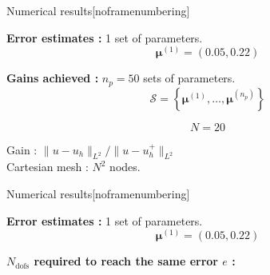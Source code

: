 \begin{appendixframe}{Numerical results}[noframenumbering]
	\hspace{-5pt}\begin{minipage}[t]{0.46\linewidth}
		\textbf{Error estimates :} 1  set of parameters.
		$$\bm{\mu}^{(1)}=(0.05, 0.22) $$
		\vspace{-35pt}
		\begin{figure}[H]
		\end{figure}
	\end{minipage} \qquad \small
	\begin{minipage}[t]{0.48\linewidth}
		\textbf{Gains achieved :} $n_p=50$ sets of parameters.
		$$\mathcal{S}=\left\{\bm{\mu}^{(1)},\dots,\bm{\mu}^{(n_p)}\right\}$$
		\vspace{-15pt}
		\begin{table}[H]
		\end{table}

		\normalsize\centering\vspace{-20pt}
		$$N=20$$

		\vspace{-5pt}
		Gain : $\| u-u_h\|_{L^2} / \| u-u_h^+\|_{L^2}$ \\
		
		\small\vspace{8pt}
		Cartesian mesh : $N^2$ nodes.
	\end{minipage}
\end{appendixframe}

\begin{appendixframe}{Numerical results}[noframenumbering]
	\hspace{-5pt}\begin{minipage}[t]{0.46\linewidth}
		\textbf{Error estimates :} 1 set of parameters.
		$$\bm{\mu}^{(1)}=(0.05, 0.22) $$
		\vspace{-35pt}
		\begin{figure}[H]
		\end{figure}
	\end{minipage} \qquad \small
	\begin{minipage}[t]{0.48\linewidth}
		\textbf{$N_\text{dofs}$ required to reach the same error $e$ :}

		\vspace{10pt}
		\begin{table}[H]
			\centering
		\end{table}
	\end{minipage}
\end{appendixframe}

